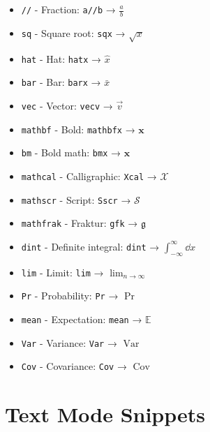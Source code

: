 \documentclass{article}
\newcommand{\snippet}[1]{\textcolor{titlebg}{\texttt{#1}}}
\newcommand{\example}[1]{\colorbox{codebg}{\texttt{#1}}}
\newcommand{\Var}{\operatorname{Var}}
\newcommand{\Cov}{\operatorname{Cov}}
\begin{document}
\begin{tcolorbox}[colback=teal!5!white,colframe=teal!75!black,title=Formatting Tools]
\begin{itemize}[leftmargin=*]
\item \snippet{//} - Fraction: \example{a//b} → \(\frac{a}{b}\)
\item \snippet{sq} - Square root: \example{sq{x}} → \(\sqrt{x}\)
\item \snippet{hat} - Hat: \example{hat{x}} → \(\hat{x}\)
\item \snippet{bar} - Bar: \example{bar{x}} → \(\bar{x}\)
\item \snippet{vec} - Vector: \example{vec{v}} → \(\vec{v}\)
\item \snippet{mathbf} - Bold: \example{mathbf{x}} → \(\mathbf{x}\)
\item \snippet{bm} - Bold math: \example{bm{x}} → \(\bm{x}\)
\item \snippet{mathcal} - Calligraphic: \example{Xcal} → \(\mathcal{X}\)
\item \snippet{mathscr} - Script: \example{Sscr} → \(\mathscr{S}\)
\item \snippet{mathfrak} - Fraktur: \example{gfk} → \(\mathfrak{g}\)
\end{itemize}
\end{tcolorbox}

\begin{tcolorbox}[colback=yellow!5!white,colframe=yellow!75!black,title=Advanced Operators]
\begin{itemize}[leftmargin=*]
\item \snippet{dint} - Definite integral: \example{dint} → \(\int_{-\infty}^{\infty} \dd{x}\)
\item \snippet{lim} - Limit: \example{lim} → \(\lim_{n \to \infty}\)
\item \snippet{Pr} - Probability: \example{Pr} → \(\Pr\)
\item \snippet{mean} - Expectation: \example{mean} → \(\mathbb{E}\)
\item \snippet{Var} - Variance: \example{Var} → \(\Var\)
\item \snippet{Cov} - Covariance: \example{Cov} → \(\Cov\)
\end{itemize}
\end{tcolorbox}

\section{Text Mode Snippets}
\end{document}
